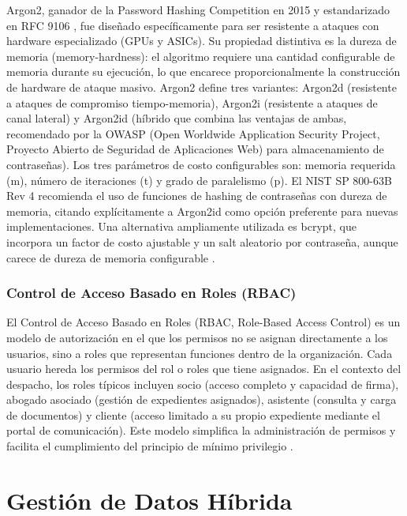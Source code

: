 Argon2, ganador de la Password Hashing Competition en 2015 y estandarizado en RFC 9106 \cite{biryukov2015,biryukov2021}, fue diseñado específicamente para ser resistente a ataques con hardware especializado (GPUs y ASICs). Su propiedad distintiva es la dureza de memoria (memory-hardness): el algoritmo requiere una cantidad configurable de memoria durante su ejecución, lo que encarece proporcionalmente la construcción de hardware de ataque masivo. Argon2 define tres variantes: Argon2d (resistente a ataques de compromiso tiempo-memoria), Argon2i (resistente a ataques de canal lateral) y Argon2id (híbrido que combina las ventajas de ambas, recomendado por la OWASP (Open Worldwide Application Security Project, Proyecto Abierto de Seguridad de Aplicaciones Web) \cite{owasp_pwstorage2024} para almacenamiento de contraseñas). Los tres parámetros de costo configurables son: memoria requerida (m), número de iteraciones (t) y grado de paralelismo (p). El NIST SP 800-63B Rev 4 \cite{nist2024} recomienda el uso de funciones de hashing de contraseñas con dureza de memoria, citando explícitamente a Argon2id como opción preferente para nuevas implementaciones. Una alternativa ampliamente utilizada es bcrypt, que incorpora un factor de costo ajustable y un salt aleatorio por contraseña, aunque carece de dureza de memoria configurable \cite{menezes1996}.

\subsubsection{Control de Acceso Basado en Roles (RBAC)}

El Control de Acceso Basado en Roles (RBAC, Role-Based Access Control) es un modelo de autorización en el que los permisos no se asignan directamente a los usuarios, sino a roles que representan funciones dentro de la organización. Cada usuario hereda los permisos del rol o roles que tiene asignados. En el contexto del despacho, los roles típicos incluyen socio (acceso completo y capacidad de firma), abogado asociado (gestión de expedientes asignados), asistente (consulta y carga de documentos) y cliente (acceso limitado a su propio expediente mediante el portal de comunicación). Este modelo simplifica la administración de permisos y facilita el cumplimiento del principio de mínimo privilegio \cite{nist2020sp80053}.

\section{Gestión de Datos Híbrida}\label{sec:gestion-datos}

